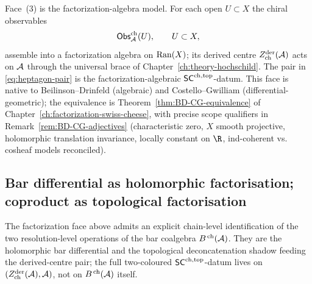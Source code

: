 Face~(3) is the factorization-algebra model. For each open $U\subset X$
the chiral observables
\begin{equation}
 \mathsf{Obs}^{\mathrm{ch}}_{\mathcal{A}}(U),\qquad U\subset X,
\end{equation}
assemble into a factorization algebra on $\mathrm{Ran}(X)$; its derived
centre $Z^{\mathrm{der}}_{\mathrm{ch}}(\mathcal{A})$ acts on $\mathcal{A}$ through the
universal brace of Chapter~\ref{ch:theory-hochschild}. The pair in
\eqref{eq:heptagon-pair} is the factorization-algebraic
$\mathsf{SC}^{\mathrm{ch},\mathrm{top}}$-datum. This face is native to Beilinson--Drinfeld
(algebraic) and Costello--Gwilliam (differential-geometric); the
equivalence is Theorem~\ref{thm:BD-CG-equivalence} of
Chapter~\ref{ch:factorization-swiss-cheese}, with precise scope
qualifiers in Remark~\ref{rem:BD-CG-adjectives} (characteristic zero,
$X$ smooth projective, holomorphic translation invariance,
locally constant on $\R$, ind-coherent vs. cosheaf models reconciled).

\subsection{Bar differential as holomorphic factorisation; coproduct as
topological factorisation}\label{subsec:bar-diff-as-hol-fact}

The factorization face above admits an explicit chain-level
identification of the two resolution-level operations of the bar
coalgebra $B^{\,\mathrm{ch}}(\mathcal{A})$. They are the holomorphic bar
differential and the topological deconcatenation shadow feeding the
derived-centre pair; the full two-coloured $\mathsf{SC}^{\mathrm{ch},\mathrm{top}}$-datum lives on
\((Z^{\mathrm{der}}_{\mathrm{ch}}(\mathcal{A}),\mathcal{A})\), not on
$B^{\,\mathrm{ch}}(\mathcal{A})$ itself.

